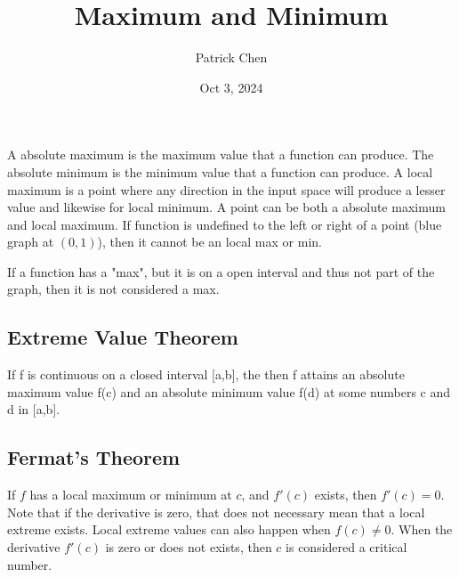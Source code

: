 \documentclass{article}
\title{Maximum and Minimum}
\author{Patrick Chen}
\date{Oct 3, 2024}
\theoremstyle{mytheoremstyle}
\theoremstyle{mytheoremstyle}
\theoremstyle{myproblemstyle}
\begin{document}
    \maketitle
    A absolute maximum is the maximum value that a function can produce. The
    absolute minimum is the minimum value that a function can produce. A local
    maximum is a point where any direction in the input space will produce a
    lesser value and likewise for local minimum. A point can be both a absolute
    maximum and local maximum. If function is undefined to the left or right of
    a point (blue graph at $(0,1)$), then it cannot be an local max or min.


    If a function has a "max", but it is on a open interval and thus not part of
    the graph, then it is not considered a max.

    \subsection*{Extreme Value Theorem}
    If f is continuous on a closed interval [a,b], the then f attains an
    absolute maximum value f(c) and an absolute minimum value f(d) at some
    numbers c and d in [a,b].

    \subsection*{Fermat's Theorem}
    If $f$ has a local maximum or minimum at $c$, and $f'(c)$ exists, then
    $f'(c)=0$. Note that if the derivative is zero, that does not necessary
    mean that a local extreme exists. Local extreme values can also happen when
    $f(c)\ne 0$. When the derivative $f'(c)$ is zero or does not exists, then
    $c$ is considered a critical number.
\end{document}

